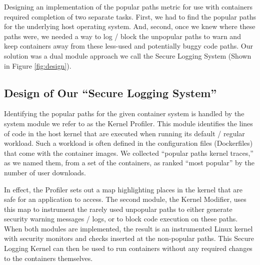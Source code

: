 Designing an implementation of the popular paths metric for use with containers required completion of two separate tasks. 
First, we had to find the popular paths for the underlying host operating system. 
And, second, once we knew where these paths were, we needed a way to log / block the unpopular paths to warn and keep containers away from these less-used and potentially buggy code paths. 
Our solution was a dual module approach we call the Secure Logging System (Shown in Figure \ref{fig:design}). 

\subsection{Design of Our ``Secure Logging System''}
\label{sec.design.secure_logging_system}
Identifying the popular paths for the given container system is handled by the system module we refer to as the Kernel Profiler. 
This module identifies the lines of code in the host kernel that are executed when running its default / regular workload. 
Such a workload is often defined in the configuration files (Dockerfiles) that come with the container images. 
We collected  ``popular paths kernel traces,'' as we named them, from a set of the containers, as  ranked ``most popular'' by the number of user downloads. 

In effect, the Profiler sets out a map highlighting places in the kernel that are safe for an application to access. 
The second module, the Kernel Modifier,  uses this map to instrument the rarely used unpopular paths to either generate security warning messages / logs, or to block code execution on these paths. 
When both modules are implemented, the result is an instrumented Linux kernel with security monitors and checks inserted at the non-popular paths. 
This Secure Logging Kernel can then be used to run containers without any required changes to the containers themselves.


